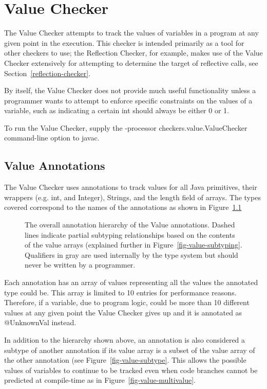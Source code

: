 \htmlhr
\chapter{Value Checker\label{value-checker}}

The Value Checker attempts to track the values of variables in a
program at any given point in the execution. This checker is intended
primarily as a tool for other checkers to use; the Reflection Checker,
for example, makes use of the Value Checker extensively for attempting
to determine the target of reflective calls, see
Section~\ref{reflection-checker}.

By itself, the Value Checker does not provide much useful
functionality unless a programmer wants to attempt to enforce specific
constraints on the values of a variable, such as indicating a certain
int should always be either 0 or 1.

To run the Value Checker, supply the -processor
checkers.value.ValueChecker command-line option to javac.

\section{Value Annotations}

The Value Checker uses annotations to track values for all Java
primitives, their wrappers (e.g. int, and Integer), Strings, and the
length field of arrays. The types covered correspond to the names of
the annotations as shown in Figure~\ref{fig-value-hierarchy}

\begin{figure}
\caption{The overall annotation hierarchy of the Value
annotations. Dashed lines indicate partial subtyping relationships
based on the contents of the value arrays (explained further in
Figure~\ref{fig-value-subtyping}. Qualifiers in gray are used
internally by the type system but should never be written by a
programmer.}
\label{fig-value-hierarchy}
\end{figure}

Each annotation has an array of values representing all the values the
annotated type could be. This array is limited to 10 entries for
performance reasons. Therefore, if a variable, due to program logic,
could be more than 10 different values at any given point the Value
Checker gives up and it is annotated as @UnknownVal instead.

In addition to the hierarchy shown above, an annotation is also
considered a subtype of another annotation if its value array is a
subset of the value array of the other annotation (see
Figure~\ref{fig-value-subtype}. This allows the possible values of
variables to continue to be tracked even when code branches cannot be
predicted at compile-time as in Figure~\ref{fig-value-multivalue}.

